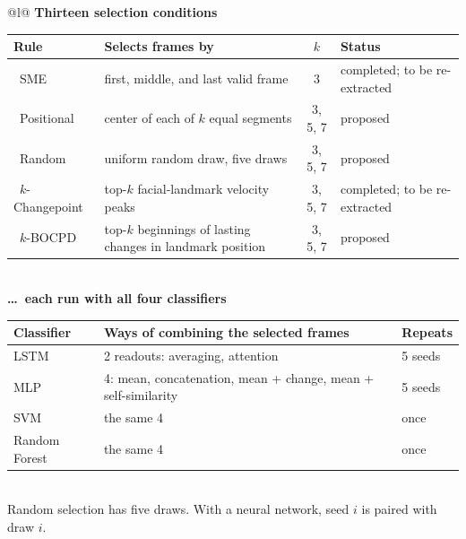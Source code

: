 \documentclass[12pt,border=10pt]{standalone}
\begin{document}
\renewcommand{\arraystretch}{1.3}
\begin{tabular}{@{}l@{}}
   \textbf{Thirteen selection conditions}\\[2pt]
   \begin{tabular}{@{}l L{6.4cm} c L{6.0cm}@{}}
      \toprule
      Rule & Selects frames by & $k$ & Status \\
      \midrule
      \ SME & first, middle, and last valid frame & 3 & completed; to be re-extracted \\
      \ Positional & center of each of $k$ equal segments & 3, 5, 7 & proposed \\
      \ Random & uniform random draw, five draws & 3, 5, 7 & proposed \\
      \ $k$-Changepoint & top-$k$ facial-landmark velocity peaks & 3, 5, 7 & completed; to be re-extracted \\
      \ $k$-BOCPD & top-$k$ beginnings of lasting changes in landmark position & 3, 5, 7 & proposed \\
      \bottomrule
   \end{tabular}\\[18pt]
   \textbf{\ldots\ each run with all four classifiers}\\[2pt]
   \begin{tabular}{@{}l L{9.6cm} l@{}}
      \toprule
      Classifier & Ways of combining the selected frames & Repeats \\
      \midrule
      LSTM & 2 readouts: averaging, attention & 5 seeds \\
      MLP & 4: mean, concatenation, mean + change, mean + self-similarity & 5 seeds \\
      SVM & the same 4 & once \\
      Random Forest & the same 4 & once \\
      \bottomrule
   \end{tabular}\\[6pt]
   {\small\textcolor{inktwo}{Random selection has five draws. With a neural network, seed $i$ is paired with draw $i$.}}
\end{tabular}
\end{document}
